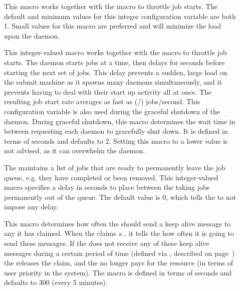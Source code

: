 \begin{description}
  
\item[] \label{param:JobStartCount}
  This macro works together with the  macro
  to throttle job starts.
  The default and minimum values for this
  integer configuration variable are both 1.
  Small values for this macro are preferred and will
  minimize the load upon the  daemon.
  
\item[] \label{param:JobStartDelay}
  This integer-valued macro works together with the
   macro
  to throttle job starts.  The   daemon starts
   jobs at a time, then delays for
   seconds before starting the next set of jobs.
  This delay prevents a sudden, large load on the submit
  machine as it spawns many  daemons simultaneously,
  and it prevents having to deal
  with their start up activity all at once.
  The resulting job start rate
  averages as fast as
  (/) jobs/second.
  This configuration variable is also used during the graceful shutdown of the
   daemon.
  During graceful shutdown, this macro determines the wait time in
  between requesting each  daemon to gracefully shut down.  
  It is defined in terms of seconds and defaults to 2.  
  Setting this macro to a lower value is not advised,
  as it can overwhelm the  daemon.

\item[] \label{param:JobIsFinishedInterval}
  The  maintains a list of jobs that are ready to permanently
  leave the job queue, e.g. they have completed or been removed.  This
  integer-valued macro specifies a delay in seconds to place between the
  taking jobs permanently out of the queue.  The default value is 0, which
  tells the  to not impose any delay.  
  
\item[] \label{param:AliveInterval} This
  macro determines how often the  should send a keep
  alive message to any  it has claimed.
  When the  claims a , it tells the  how often it is
  going to send these messages.
  If the  does not receive any of these keep alive messages
  during a certain period of time (defined via
  , described on
  page~\pageref{param:MaxClaimAlivesMissed})
  the  releases the claim, and the  no longer pays for
  the resource (in terms of user priority in the system).
  The macro is defined in terms of seconds and defaults to 300 (every
  5 minutes).


\end{description}

